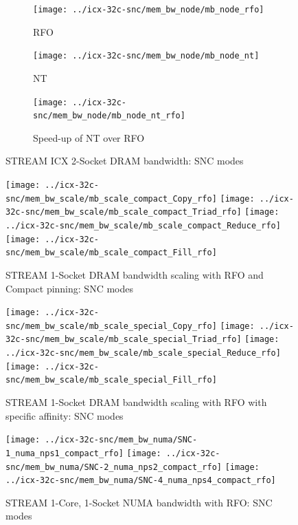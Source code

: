 \documentclass{article}
\begin{document}
\begin{figure}[!hb]
    \centering
    \begin{subfigure}[!hb]{0.3\textwidth}
         \centering
         \texttt{[image: ../icx-32c-snc/mem\_bw\_node/mb\_node\_rfo]}
         \caption{RFO}
         \label{figure:mem_bw_node_rfo_icx_snc}
    \end{subfigure}
    \begin{subfigure}[!hb]{0.3\textwidth}
         \centering
         \texttt{[image: ../icx-32c-snc/mem\_bw\_node/mb\_node\_nt]}
         \caption{NT}
         \label{figure:mem_bw_node_nt_icx_snc}
    \end{subfigure}
    \begin{subfigure}[!hb]{0.3\textwidth}
         \centering
         \texttt{[image: ../icx-32c-snc/mem\_bw\_node/mb\_node\_nt\_rfo]}
         \caption{Speed-up of NT over RFO}
         \label{figure:mem_bw_node_nt_rfo_icx_snc}
    \end{subfigure}

    \caption{STREAM ICX 2-Socket DRAM bandwidth: SNC modes}
    \label{figure:mem_bw_node_icx_snc}
\end{figure}


\begin{figure}[!hb]
    \centering
    \texttt{[image: ../icx-32c-snc/mem\_bw\_scale/mb\_scale\_compact\_Copy\_rfo]}
    \texttt{[image: ../icx-32c-snc/mem\_bw\_scale/mb\_scale\_compact\_Triad\_rfo]}
    \texttt{[image: ../icx-32c-snc/mem\_bw\_scale/mb\_scale\_compact\_Reduce\_rfo]}
    \texttt{[image: ../icx-32c-snc/mem\_bw\_scale/mb\_scale\_compact\_Fill\_rfo]}
    \caption{STREAM 1-Socket DRAM bandwidth scaling with RFO and Compact pinning: SNC modes}
    \label{figure:mem_bw_scale_compact_rfo_icx_snc}
\end{figure}

\begin{figure}[!hb]
    \centering
    \texttt{[image: ../icx-32c-snc/mem\_bw\_scale/mb\_scale\_special\_Copy\_rfo]}
    \texttt{[image: ../icx-32c-snc/mem\_bw\_scale/mb\_scale\_special\_Triad\_rfo]}
    \texttt{[image: ../icx-32c-snc/mem\_bw\_scale/mb\_scale\_special\_Reduce\_rfo]}
    \texttt{[image: ../icx-32c-snc/mem\_bw\_scale/mb\_scale\_special\_Fill\_rfo]}
    \caption{STREAM 1-Socket DRAM bandwidth scaling with RFO with specific affinity: SNC modes}
    \label{figure:mem_bw_scale_special_rfo_icx_snc}
\end{figure}

\begin{figure}[!hb]
    \centering
    \texttt{[image: ../icx-32c-snc/mem\_bw\_numa/SNC-1\_numa\_nps1\_compact\_rfo]}
    \texttt{[image: ../icx-32c-snc/mem\_bw\_numa/SNC-2\_numa\_nps2\_compact\_rfo]}
    \texttt{[image: ../icx-32c-snc/mem\_bw\_numa/SNC-4\_numa\_nps4\_compact\_rfo]}
    \caption{STREAM 1-Core, 1-Socket NUMA bandwidth with RFO: SNC modes}
    \label{figure:mem_bw_numa_rfo_icx_snc}
\end{figure}
\end{document}
